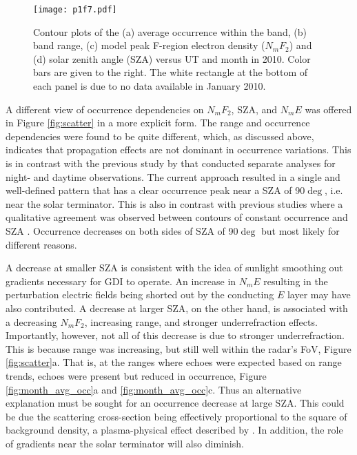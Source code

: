 \begin{figure}
	\centering
	\texttt{[image: p1f7.pdf]}
	\caption[Summary of annual and diurnal variations]{Contour plots of the (a) average occurrence within the band, (b) band range, (c) model peak F-region electron density (\(N_mF_2\)) and (d) solar zenith angle (SZA) versus UT and month in 2010. Color bars are given to the right. The white rectangle at the bottom of each panel is due to no data available in January 2010.}
	\label{fig:month_ut}
\end{figure}

A different view of occurrence dependencies on \(N_mF_2\), SZA, and \(N_mE\) was offered in Figure \ref{fig:scatter} in a more explicit form. The range and occurrence dependencies were found to be quite different, which, as discussed above, indicates that propagation effects are not dominant in occurrence variations. This is in contrast with the previous study by \citet{Kane2012} that conducted separate analyses for night- and daytime observations. The current approach resulted in a single and well-defined pattern that has a clear occurrence peak near a SZA of 90\(\deg\), i.e. near the solar terminator. This is also in contrast with previous studies where a qualitative agreement was observed between contours of constant occurrence and SZA \citep{Kane2012,Ghezelbash2014b}. Occurrence decreases on both sides of SZA of 90\(\deg\) but most likely for different reasons.

A decrease at smaller SZA is consistent with the idea of sunlight smoothing out gradients necessary for GDI to operate. An increase in \(N_mE\) resulting in the perturbation electric fields being shorted out by the conducting \(E\) layer may have also contributed. A decrease at larger SZA, on the other hand, is associated with a decreasing \(N_mF_2\), increasing range, and stronger underrefraction effects. Importantly, however, not all of this decrease is due to stronger underrefraction. This is because range was increasing, but still well within the radar's FoV, Figure \ref{fig:scatter}a. That is, at the ranges where echoes were expected based on range trends, echoes were present but reduced in occurrence, Figure \ref{fig:month_avg_occ}a and \ref{fig:month_avg_occ}c. Thus an alternative explanation must be sought for an occurrence decrease at large SZA. This could be due the scattering cross-section being effectively proportional to the square of background density, a plasma-physical effect described by \citet{Makarevich2014b}. In addition, the role of gradients near the solar terminator will also diminish.

